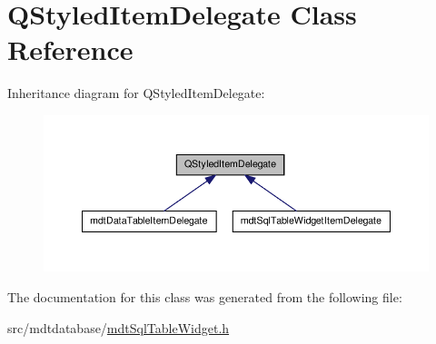 \hypertarget{class_q_styled_item_delegate}{\section{Q\-Styled\-Item\-Delegate Class Reference}
\label{class_q_styled_item_delegate}
}


Inheritance diagram for Q\-Styled\-Item\-Delegate\-:\nopagebreak
\begin{figure}[H]
\begin{center}
\leavevmode
\includegraphics[width=350pt]{class_q_styled_item_delegate__inherit__graph}
\end{center}
\end{figure}


The documentation for this class was generated from the following file\-:\begin{DoxyCompactItemize}
\item 
src/mdtdatabase/\hyperlink{mdt_sql_table_widget_8h}{mdt\-Sql\-Table\-Widget.\-h}\end{DoxyCompactItemize}
